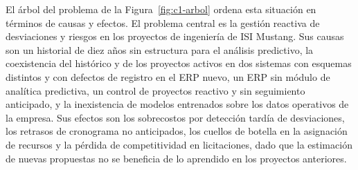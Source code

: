 El árbol del problema de la Figura~\ref{fig:c1-arbol} ordena esta situación en términos de causas y efectos. El problema central es la gestión reactiva de desviaciones y riesgos en los proyectos de ingeniería de ISI Mustang. Sus causas son un historial de diez años sin estructura para el análisis predictivo, la coexistencia del histórico y de los proyectos activos en dos sistemas con esquemas distintos y con defectos de registro en el ERP nuevo, un ERP sin módulo de analítica predictiva, un control de proyectos reactivo y sin seguimiento anticipado, y la inexistencia de modelos entrenados sobre los datos operativos de la empresa. Sus efectos son los sobrecostos por detección tardía de desviaciones, los retrasos de cronograma no anticipados, los cuellos de botella en la asignación de recursos y la pérdida de competitividad en licitaciones, dado que la estimación de nuevas propuestas no se beneficia de lo aprendido en los proyectos anteriores.


